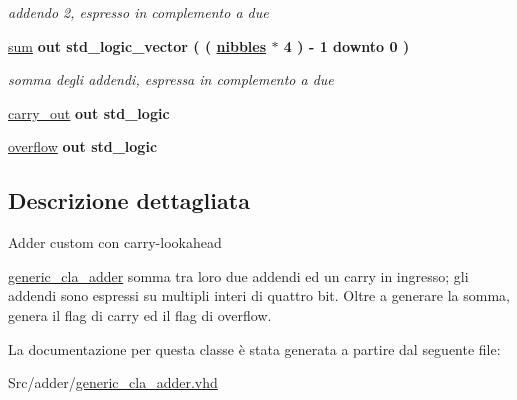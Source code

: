 \begin{DoxyCompactItemize}
\begin{DoxyCompactList}\small\item\em addendo 2, espresso in complemento a due \end{DoxyCompactList}\item 
\hyperlink{group___carry_loockahead_ga1b4798a9e96bb32e9c08ce68e24e7871}{sum}  {\bfseries {\bfseries \textcolor{vhdlchar}{out}\textcolor{vhdlchar}{ }}} {\bfseries \textcolor{vhdlchar}{std\+\_\+logic\+\_\+vector}\textcolor{vhdlchar}{ }\textcolor{vhdlchar}{(}\textcolor{vhdlchar}{ }\textcolor{vhdlchar}{(}\textcolor{vhdlchar}{ }\textcolor{vhdlchar}{ }\textcolor{vhdlchar}{ }\textcolor{vhdlchar}{ }{\bfseries \hyperlink{group___carry_loockahead_ga0b63b586531492d0fa882246cca071c1}{nibbles}} \textcolor{vhdlchar}{$\ast$}\textcolor{vhdlchar}{ } \textcolor{vhdldigit}{4} \textcolor{vhdlchar}{ }\textcolor{vhdlchar}{)}\textcolor{vhdlchar}{ }\textcolor{vhdlchar}{-\/}\textcolor{vhdlchar}{ } \textcolor{vhdldigit}{1} \textcolor{vhdlchar}{ }\textcolor{vhdlchar}{downto}\textcolor{vhdlchar}{ }\textcolor{vhdlchar}{ } \textcolor{vhdldigit}{0} \textcolor{vhdlchar}{ }\textcolor{vhdlchar}{)}\textcolor{vhdlchar}{ }} 
\begin{DoxyCompactList}\small\item\em somma degli addendi, espressa in complemento a due \end{DoxyCompactList}\item 
\hyperlink{group___carry_loockahead_ga851aaea297bdc862fba5478c4bf0e214}{carry\+\_\+out}  {\bfseries {\bfseries \textcolor{vhdlchar}{out}\textcolor{vhdlchar}{ }}} {\bfseries \textcolor{vhdlchar}{std\+\_\+logic}\textcolor{vhdlchar}{ }} 
\item 
\hyperlink{group___carry_loockahead_ga9650307dde287e0bcfa1e26370c006c2}{overflow}  {\bfseries {\bfseries \textcolor{vhdlchar}{out}\textcolor{vhdlchar}{ }}} {\bfseries \textcolor{vhdlchar}{std\+\_\+logic}\textcolor{vhdlchar}{ }} 
\end{DoxyCompactItemize}


\subsection{Descrizione dettagliata}
Adder custom con carry-\/lookahead

\hyperlink{classgeneric__cla__adder}{generic\+\_\+cla\+\_\+adder} somma tra loro due addendi ed un carry in ingresso; gli addendi sono espressi su multipli interi di quattro bit. Oltre a generare la somma, genera il flag di carry ed il flag di overflow. 

La documentazione per questa classe è stata generata a partire dal seguente file\+:\begin{DoxyCompactItemize}
\item 
Src/adder/\hyperlink{generic__cla__adder_8vhd}{generic\+\_\+cla\+\_\+adder.\+vhd}\end{DoxyCompactItemize}

